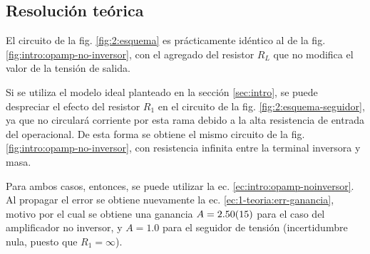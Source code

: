\subsection{Resolución teórica}

El circuito de la fig. \ref{fig:2:esquema} es prácticamente idéntico al de
la fig. \ref{fig:intro:opamp-no-inversor}, con el agregado del resistor $R_L$
que no modifica el valor de la tensión de salida.

Si se utiliza el modelo ideal planteado en la sección
\ref{sec:intro}, se puede despreciar el efecto del resistor
$R_1$ en el circuito de la fig. \ref{fig:2:esquema-seguidor}, ya que no
circulará corriente por esta rama debido a la alta resistencia de entrada del
operacional. De esta forma se obtiene el mismo circuito de la fig.
\ref{fig:intro:opamp-no-inversor}, con resistencia infinita entre la terminal
inversora y masa.

Para ambos casos, entonces, se puede utilizar la ec.
\ref{ec:intro:opamp-noinversor}. Al propagar el error se obtiene nuevamente
la ec. \ref{ec:1-teoria:err-ganancia}, motivo por el cual se obtiene una 
ganancia $A = \num{2.5 \pm 0.15}$ para el caso del amplificador no inversor,
y $A = \num{1.0}$ para el seguidor de tensión (incertidumbre nula, puesto que
$R_1 = \infty$).
